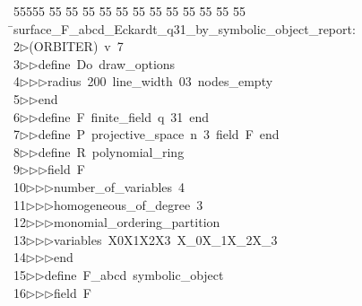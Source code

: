 %
%
\begin{tabbing}
55555 \= 55 \= 55 \= 55 \= 55 \= 55 \= 55 \= 55 \= 55 \= 55 \= 55 \= 55 \= 55 \= \>surface\_F\_abcd\_Eckardt\_q31\_by\_symbolic\_object\_report:\\[0pt]
2\>$\triangleright$\>(ORBITER)\ v\ 7\ \\[0pt]
3\>$\triangleright$\>$\triangleright$\>define\ Do\ draw\_options\ \\[0pt]
4\>$\triangleright$\>$\triangleright$\>$\triangleright$\>radius\ 200\ line\_width\ 03\ nodes\_empty\ \\[0pt]
5\>$\triangleright$\>$\triangleright$\>end\ \\[0pt]
6\>$\triangleright$\>$\triangleright$\>define\ F\ finite\_field\ q\ 31\ end\ \\[0pt]
7\>$\triangleright$\>$\triangleright$\>define\ P\ projective\_space\ n\ 3\ field\ F\ end\ \\[0pt]
8\>$\triangleright$\>$\triangleright$\>define\ R\ polynomial\_ring\ \\[0pt]
9\>$\triangleright$\>$\triangleright$\>$\triangleright$\>field\ F\ \\[0pt]
10\>$\triangleright$\>$\triangleright$\>$\triangleright$\>number\_of\_variables\ 4\ \\[0pt]
11\>$\triangleright$\>$\triangleright$\>$\triangleright$\>homogeneous\_of\_degree\ 3\ \\[0pt]
12\>$\triangleright$\>$\triangleright$\>$\triangleright$\>monomial\_ordering\_partition\ \\[0pt]
13\>$\triangleright$\>$\triangleright$\>$\triangleright$\>variables\ X0X1X2X3\ X\_0X\_1X\_2X\_3\ \\[0pt]
14\>$\triangleright$\>$\triangleright$\>$\triangleright$\>end\ \\[0pt]
15\>$\triangleright$\>$\triangleright$\>define\ F\_abcd\ symbolic\_object\ \\[0pt]
16\>$\triangleright$\>$\triangleright$\>$\triangleright$\>field\ F\ \\[0pt]

\end{tabbing}

